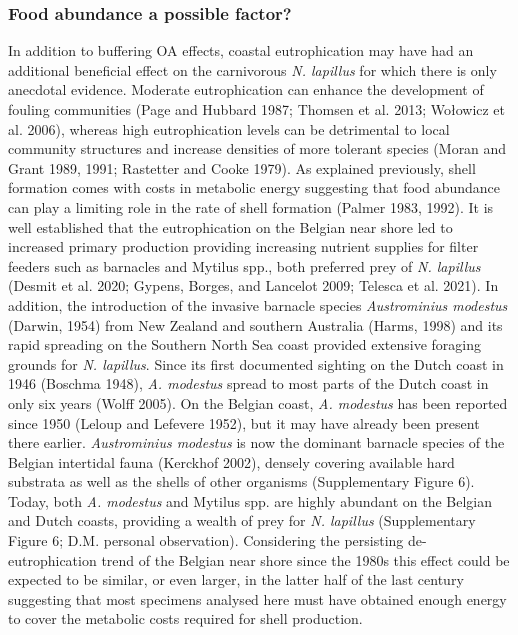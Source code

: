 \documentclass[smallextended]{svjour3}       %
\begin{document}
\hypertarget{food-abundance-a-possible-factor}{%
\subsubsection{Food abundance a possible
factor?}\label{food-abundance-a-possible-factor}}

In addition to buffering OA effects, coastal eutrophication may have had
an additional beneficial effect on the carnivorous \emph{N. lapillus}
for which there is only anecdotal evidence. Moderate eutrophication can
enhance the development of fouling communities (Page and Hubbard 1987;
Thomsen et al. 2013; Wołowicz et al. 2006), whereas high eutrophication
levels can be detrimental to local community structures and increase
densities of more tolerant species (Moran and Grant 1989, 1991;
Rastetter and Cooke 1979). As explained previously, shell formation
comes with costs in metabolic energy suggesting that food abundance can
play a limiting role in the rate of shell formation (Palmer 1983, 1992).
It is well established that the eutrophication on the Belgian near shore
led to increased primary production providing increasing nutrient
supplies for filter feeders such as barnacles and Mytilus spp., both
preferred prey of \emph{N. lapillus} (Desmit et al. 2020; Gypens,
Borges, and Lancelot 2009; Telesca et al. 2021). In addition, the
introduction of the invasive barnacle species \emph{Austrominius
modestus} (Darwin, 1954) from New Zealand and southern Australia (Harms,
1998) and its rapid spreading on the Southern North Sea coast provided
extensive foraging grounds for \emph{N. lapillus}. Since its first
documented sighting on the Dutch coast in 1946 (Boschma 1948), \emph{A.
modestus} spread to most parts of the Dutch coast in only six years
(Wolff 2005). On the Belgian coast, \emph{A. modestus} has been reported
since 1950 (Leloup and Lefevere 1952), but it may have already been
present there earlier. \emph{Austrominius modestus} is now the dominant
barnacle species of the Belgian intertidal fauna (Kerckhof 2002),
densely covering available hard substrata as well as the shells of other
organisms (Supplementary Figure 6). Today, both \emph{A. modestus} and
Mytilus spp. are highly abundant on the Belgian and Dutch coasts,
providing a wealth of prey for \emph{N. lapillus} (Supplementary Figure
6; D.M. personal observation). Considering the persisting
de-eutrophication trend of the Belgian near shore since the 1980s this
effect could be expected to be similar, or even larger, in the latter
half of the last century suggesting that most specimens analysed here
must have obtained enough energy to cover the metabolic costs required
for shell production.
\end{document}
